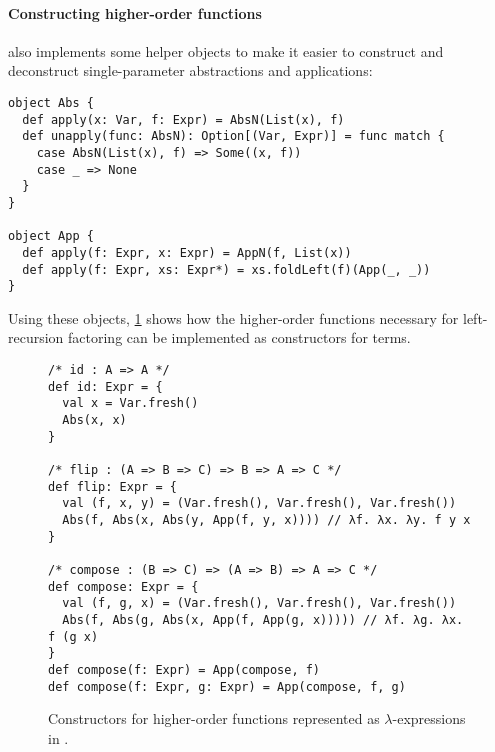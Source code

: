 \documentclass[../../../main.tex]{subfiles}
\begin{document}
\paragraph{Constructing higher-order functions}
 also implements some helper objects to make it easier to construct and deconstruct single-parameter abstractions and applications:
\begin{verbatim}
object Abs {
  def apply(x: Var, f: Expr) = AbsN(List(x), f)
  def unapply(func: AbsN): Option[(Var, Expr)] = func match {
    case AbsN(List(x), f) => Some((x, f))
    case _ => None
  }
}

object App {
  def apply(f: Expr, x: Expr) = AppN(f, List(x))
  def apply(f: Expr, xs: Expr*) = xs.foldLeft(f)(App(_, _))
}
\end{verbatim}
%
Using these objects, \cref{fig:higher-order-funcs} shows how the higher-order functions necessary for left-recursion factoring can be implemented as constructors for  terms.

\begin{figure}
\begin{verbatim}
/* id : A => A */
def id: Expr = {
  val x = Var.fresh()
  Abs(x, x)
}

/* flip : (A => B => C) => B => A => C */
def flip: Expr = {
  val (f, x, y) = (Var.fresh(), Var.fresh(), Var.fresh())
  Abs(f, Abs(x, Abs(y, App(f, y, x)))) // λf. λx. λy. f y x
}

/* compose : (B => C) => (A => B) => A => C */
def compose: Expr = {
  val (f, g, x) = (Var.fresh(), Var.fresh(), Var.fresh())
  Abs(f, Abs(g, Abs(x, App(f, App(g, x))))) // λf. λg. λx. f (g x)
}
def compose(f: Expr) = App(compose, f)
def compose(f: Expr, g: Expr) = App(compose, f, g)
\end{verbatim}
\caption{Constructors for higher-order functions represented as $\lambda$-expressions in .}
\label{fig:higher-order-funcs}
\end{figure}

\end{document}

